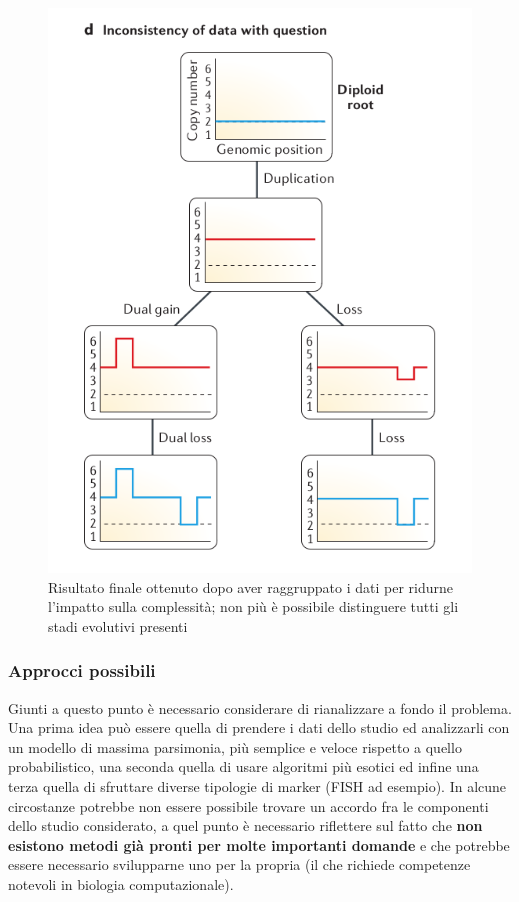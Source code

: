 \documentclass[a4paper]{article}
\begin{document}
	\begin{figure}[H]
	  \centering
	  \includegraphics[scale=0.30, keepaspectratio]{EsDomanda.png}%
	  \captionsetup{justification=centering,margin=0.5cm}
	  \caption{Risultato finale ottenuto dopo aver raggruppato i dati per ridurne l'impatto sulla complessità; non più è possibile 
	distinguere tutti gli stadi evolutivi presenti} \label{fig:EsDomanda}
	\end{figure}

	\subsubsection{Approcci possibili}
	Giunti a questo punto è necessario considerare di rianalizzare a fondo il problema. Una prima
	idea può essere quella di prendere i dati dello studio ed analizzarli con un modello di massima parsimonia,
	più semplice e veloce rispetto a quello probabilistico, una seconda quella di usare algoritmi più esotici ed
	infine una terza quella di sfruttare diverse tipologie di marker (FISH ad esempio).
	In alcune circostanze potrebbe non essere possibile trovare un accordo fra le componenti dello studio
	considerato, a quel punto è necessario riflettere sul fatto che \textbf{non esistono metodi già pronti per molte
	importanti domande} e che potrebbe essere necessario svilupparne uno per la propria (il che richiede competenze
	notevoli in biologia computazionale).
\end{document}
